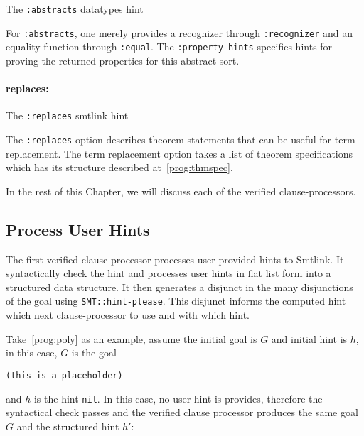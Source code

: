 \begin{program}[h]
  \caption{The \texttt{:abstracts} datatypes hint}
  \label{prog:abstracthint}
  
\end{program}

For \texttt{:abstracts}, one merely provides a recognizer through
\texttt{:recognizer} and an equality function through \texttt{:equal}.
The \texttt{:property-hints} specifies hints for proving the returned
properties for this abstract sort.

\paragraph{replaces: }

\begin{program}[h]
  \caption{The \texttt{:replaces} smtlink hint}
  \label{prog:replacehint}
  
\end{program}

The \texttt{:replaces} option describes theorem statements that can be useful
for term replacement. The term replacement option takes a list of theorem
specifications which has its structure described at~\ref{prog:thmspec}.

In the rest of this Chapter, we will discuss each of the verified
clause-processors.

\subsection{Process User Hints}
The first verified clause processor processes user provided hints to Smtlink. It
syntactically check the hint and processes user hints in flat list form into a
structured data structure. It then generates a disjunct in the many disjunctions
of the goal using \texttt{SMT::hint-please}. This disjunct informs the computed
hint which next clause-processor to use and with which hint.

Take~\ref{prog:poly} as an example, assume the initial goal is $G$ and initial
hint is $h$, in this case, $G$ is the goal

\begin{lstlisting}[style=codestyle,language=LISP]
(this is a placeholder)
\end{lstlisting}

\noindent and $h$ is the hint \texttt{nil}. In this case, no user hint is
provides, therefore the syntactical check passes and the verified clause
processor produces the same goal $G$ and the structured hint $h'$:

